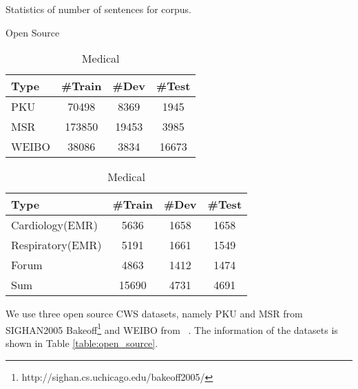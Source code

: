 \begin{table}	
	\centering
	\caption{Statistics of number of sentences for corpus.}\label{table:statistics}
	\begin{subtable}[t]{.45\textwidth}
		\caption{Open Source}\label{table:open_source}
		\begin{tabular}{lccc}

			\hline
			Type & \#Train & \#Dev & \#Test\\
			\hline
			PKU & 70498 & 8369 & 1945\\
			MSR & 173850 & 19453 & 3985 \\
			WEIBO & 38086 & 3834 & 16673 \\
			\hline
		\end{tabular}
	\end{subtable}
	\quad
	\quad
	\begin{subtable}[t]{.45\textwidth}
		\caption{Medical}\label{table:medical}
		\begin{tabular}{lccc}
			\hline
			Type & \#Train & \#Dev & \#Test\\
			\hline
			Cardiology(EMR) & 5636 & 1658 & 1658\\
			Respiratory(EMR) & 5191 & 1661& 1549\\
			Forum & 4863 & 1412 & 1474\\
			\hline
			Sum & 15690 & 4731 & 4691\\
			\hline
		\end{tabular}
	\end{subtable}
\end{table}


We use three open source CWS datasets, namely PKU and MSR from SIGHAN2005 Bakeoff\footnote{http://sighan.cs.uchicago.edu/bakeoff2005/} and WEIBO from ~\cite{qiu2016overview}. The information of the datasets is shown in Table \ref{table:open_source}.

